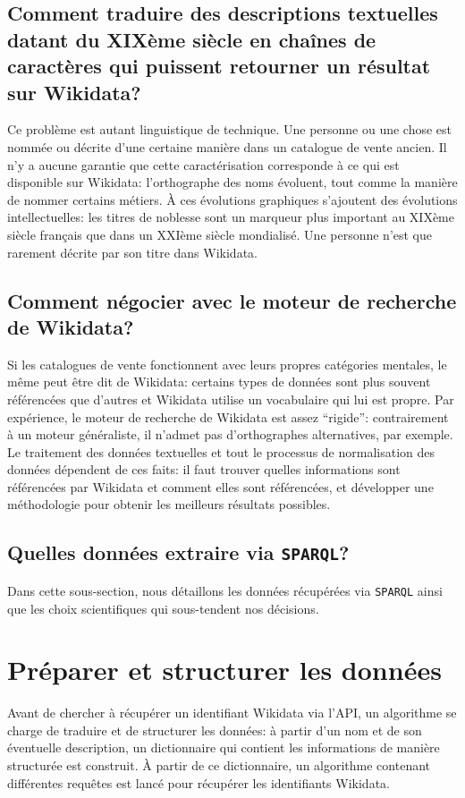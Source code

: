\documentclass[a4paper, 12pt, twoside]{book}
\newcommand{\sparql}{\texttt{SPARQL}}
\begin{document}
\subsection{Comment traduire des descriptions textuelles datant du XIXème siècle en chaînes de caractères qui puissent retourner un résultat sur Wikidata?} 
Ce problème est autant linguistique de technique. Une personne ou une chose est nommée ou décrite d'une certaine manière dans un catalogue de vente ancien. Il n'y a aucune garantie que cette caractérisation corresponde à ce qui est disponible sur Wikidata: l'orthographe des noms évoluent, tout comme la manière de nommer certains métiers. À ces évolutions graphiques s'ajoutent des évolutions intellectuelles: les titres de noblesse sont un marqueur plus important au XIXème siècle français que dans un XXIème siècle mondialisé. Une personne n'est que rarement décrite par son titre dans Wikidata.

\subsection{Comment négocier avec le moteur de recherche de Wikidata?} 
Si les catalogues de vente fonctionnent avec leurs propres catégories mentales, le même peut être dit de Wikidata: certains types de données sont plus souvent référencées que d'autres et Wikidata utilise un vocabulaire qui lui est propre. Par expérience, le moteur de recherche de Wikidata est assez \enquote{rigide}: contrairement à un moteur généraliste, il n'admet pas d'orthographes alternatives, par exemple. Le traitement des données textuelles et tout le processus de normalisation des données dépendent de ces faits: il faut trouver quelles informations sont référencées par Wikidata et comment elles sont référencées, et développer une méthodologie pour obtenir les meilleurs résultats possibles.

\subsection{Quelles données extraire via \sparql?}
Dans cette sous-section, nous détaillons les données récupérées via \sparql{} ainsi que les choix scientifiques qui sous-tendent nos décisions.

\section{Préparer et structurer les données}
Avant de chercher à récupérer un identifiant Wikidata via l'API, un algorithme se charge de traduire et de structurer les données: à partir d'un nom et de son éventuelle description, un dictionnaire qui contient les informations de manière structurée est construit. À partir de ce dictionnaire, un algorithme contenant différentes requêtes est lancé pour récupérer les identifiants Wikidata.
\end{document}
